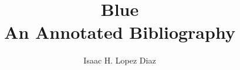\documentclass{article}
\title{Blue\\
An Annotated Bibliography}
\author{Isaac H. Lopez Diaz}
\begin{document}
\maketitle


\nocite{*}
\end{document}
